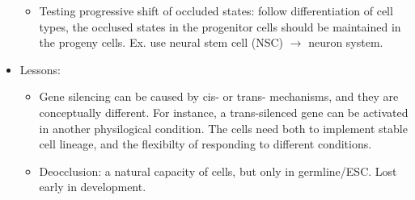 \documentclass{report}
\begin{document}
\begin{itemize}
\begin{itemize}
		\item Testing progressive shift of occluded states: follow differentiation of cell types, the occlused states in the progenitor cells should be maintained in the progeny cells. Ex. use neural stem cell (NSC) $\rightarrow$ neuron system. 
	\end{itemize}
	\item Lessons:
	\begin{itemize}
		\item Gene silencing can be caused by cis- or trans- mechanisms, and they are conceptually different. For instance, a trans-silenced gene can be activated in another physilogical condition. The cells need both to implement stable cell lineage, and the flexibilty of responding to different conditions. 
		\item Deocclusion: a natural capacity of cells, but only in germline/ESC. Lost early in development. 
	\end{itemize}
\end{itemize}
\end{document}
